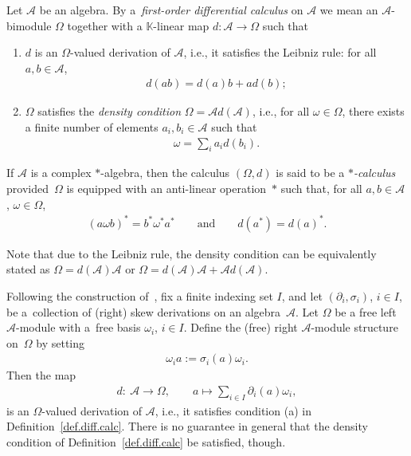 \documentclass[pdftex]{sigma}
\numberwithin{equation}{section}
\begin{document}
\begin{Definition}\label{def.diff.calc}
Let ${\mathcal{A}}$ be an algebra. By a~{\em first-order differential calculus} on ${\mathcal{A}}$ we mean an ${\mathcal{A}}$-bimodule $\Omega$ together with a ${\mathbb K}$-linear map $d\colon {\mathcal{A}} \to \Omega$ such that
\begin{enumerate}\itemsep=0pt
\item[(a)] $d$ is an $\Omega$-valued derivation of ${\mathcal{A}}$, i.e., it satisf\/ies the Leibniz rule: for all $a,b\in {\mathcal{A}}$,
\begin{gather*}
 d(ab) = d(a) b + ad(b);
\end{gather*}
 \item[(b)] $\Omega$ satisf\/ies the {\em density condition} $\Omega = {\mathcal{A}} d({\mathcal{A}})$, i.e., for all $\omega \in \Omega$, there exists a f\/inite number of elements $a_i,b_i\in {\mathcal{A}}$ such that
 \begin{gather*}
 \omega = \sum_i a_i d(b_i).
 \end{gather*}
 \end{enumerate}

If ${\mathcal{A}}$ is a complex $*$-algebra, then the calculus $(\Omega, d)$ is said to be a {\em $*$-calculus} provided~$\Omega$ is equipped with an anti-linear operation~$*$ such that, for all $a,b\in {\mathcal{A}}$, $\omega\in \Omega$,
\begin{gather*}
(a\omega b)^* = b^*\omega^* a^* \qquad \mbox{and}\qquad d(a^*) = d(a)^*.
\end{gather*}
\end{Definition}

Note that due to the Leibniz rule, the density condition can be equivalently stated as $\Omega = d({\mathcal{A}}) {\mathcal{A}}$ or $\Omega = d({\mathcal{A}}) {\mathcal{A}} +{\mathcal{A}} d({\mathcal{A}})$.

Following the construction of~\cite{BrzElK:int}, f\/ix a f\/inite indexing set $I$, and let $(\partial_i, \sigma_i)$, $i\in I$, be a~collection of (right) skew derivations on an algebra~${\mathcal{A}}$. Let $\Omega$ be a free left ${\mathcal{A}}$-module with a~free basis $\omega_i$, $i\in I$. Def\/ine the (free) right ${\mathcal{A}}$-module structure on~$\Omega$ by setting
\begin{gather}\label{right}
\omega_i a := \sigma_i(a) \omega_i.
\end{gather}
Then the map
\begin{gather}\label{ext}
d\colon \ {\mathcal{A}} \to \Omega, \qquad a\mapsto \sum_{i\in I} \partial_i(a)\omega_i,
\end{gather}
is an $\Omega$-valued derivation of ${\mathcal{A}}$, i.e., it satisf\/ies condition (a) in Def\/inition~\ref{def.diff.calc}. There is no guarantee in general that the density condition of Def\/inition~\ref{def.diff.calc} be satisf\/ied, though.
\end{document}
